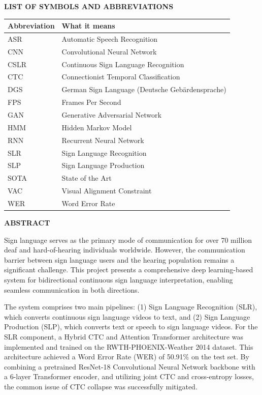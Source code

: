 \begin{center}
{\Large \bfseries LIST OF SYMBOLS AND ABBREVIATIONS}\\[1cm]
\end{center}
\begin{longtable}{@{}ll@{}}
\textbf{Abbreviation} & \textbf{What it means}\\
\midrule
ASR & Automatic Speech Recognition \\
CNN & Convolutional Neural Network \\
CSLR & Continuous Sign Language Recognition\\
CTC & Connectionist Temporal Classification\\
DGS & German Sign Language (Deutsche Gebärdensprache) \\
FPS & Frames Per Second\\
GAN & Generative Adversarial Network\\
HMM & Hidden Markov Model\\
RNN & Recurrent Neural Network \\
SLR & Sign Language Recognition\\
SLP & Sign Language Production\\
SOTA & State of the Art\\
VAC & Visual Alignment Constraint\\
WER & Word Error Rate\\
\end{longtable}
\clearpage
{} %

\begin{center}
{\Large \bfseries ABSTRACT}\\[1cm]
\end{center}

Sign language serves as the primary mode of communication for over 70 million deaf and hard-of-hearing individuals worldwide. However, the communication barrier between sign language users and the hearing population remains a significant challenge. This project presents a comprehensive deep learning-based system for bidirectional continuous sign language interpretation, enabling seamless communication in both directions.

The system comprises two main pipelines: (1) Sign Language Recognition (SLR), which converts continuous sign language videos to text, and (2) Sign Language Production (SLP), which converts text or speech to sign language videos. For the SLR component, a Hybrid CTC and Attention Transformer architecture was implemented and trained on the RWTH-PHOENIX-Weather 2014 dataset. This architecture achieved a Word Error Rate (WER) of 50.91\% on the test set. By combining a pretrained ResNet-18 Convolutional Neural Network backbone with a 6-layer Transformer encoder, and utilizing joint CTC and cross-entropy losses, the common issue of CTC collapse was successfully mitigated.

